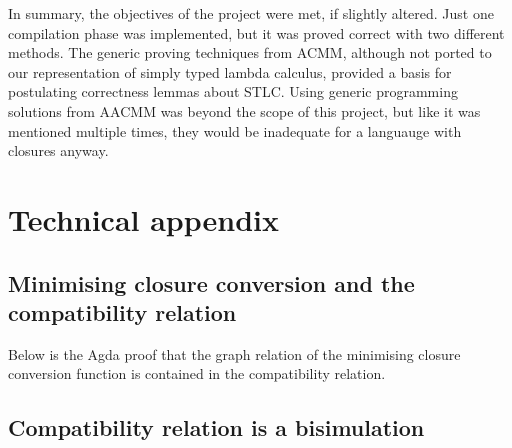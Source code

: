 \documentclass[bsc,frontabs,oneside,singlespacing,parskip,deptreport]{infthesis}
\theoremstyle{definition}
\theoremstyle{lemma}
\begin{document}
In summary, the objectives of the project were met, if slightly
altered. Just one compilation phase was implemented, but it was proved
correct with two different methods. The generic proving techniques
from ACMM, although not ported to our representation of simply typed
lambda calculus, provided a basis for postulating correctness lemmas
about STLC. Using generic programming solutions from AACMM was beyond
the scope of this project, but like it was mentioned multiple times,
they would be inadequate for a languauge with closures anyway.





\chapter{Technical appendix}
\label{cha:technical-appendix}

\section{Minimising closure conversion and the compatibility relation}
\label{sec:minim-clos-conv-2}

Below is the Agda proof that the graph relation of the minimising
closure conversion function is contained in the compatibility relation.


\section{Compatibility relation is a bisimulation}
\label{sec:comp-relat-bisim-1}

\end{document}
